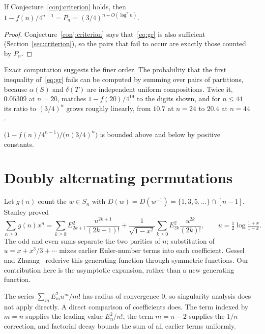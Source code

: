 \documentclass[12pt]{article}
\numberwithin{theorem}{section}
\numberwithin{equation}{section}
\begin{document}
\begin{corollary}\label{cor:rate}
If Conjecture~\ref{conj:criterion} holds, then $1-f(n)/4^{n-1}=P_n=(3/4)^{n+O(\log^2n)}$.
\end{corollary}

\begin{proof}
Conjecture~\ref{conj:criterion} says that~\eqref{eq:gr} is also sufficient (Section~\ref{sec:criterion}), so the
pairs that fail to occur are exactly those counted by $P_n$.
\end{proof}

Exact computation suggests the finer order. The probability that the first inequality of~\eqref{eq:gr} fails
can be computed by summing over pairs of partitions, because $\alpha(S)$ and $\delta(T)$ are independent uniform
compositions. Twice it, $0.05309$ at $n=20$, matches $1-f(20)/4^{19}$ to the digits shown, and for $n\le44$ its
ratio to $(3/4)^n$ grows roughly linearly, from $10.7$ at $n=24$ to $20.4$ at $n=44$.

\begin{conjecture}\label{conj:rate}
$\bigl(1-f(n)/4^{n-1}\bigr)/\bigl(n(3/4)^n\bigr)$ is bounded above and below by positive constants.
\end{conjecture}

\section{Doubly alternating permutations}\label{sec:alt}

Let $g(n)$ count the $w\in S_n$ with $D(w)=D(w^{-1})=\{1,3,5,\dots\}\cap[n-1]$. Stanley
\cite[Theorem~3.1]{stanleyAlt} proved
\begin{equation}\label{eq:stanley}
\sum_{n\ge0}g(n)x^n=\sum_{k\ge0}E_{2k+1}^2\frac{u^{2k+1}}{(2k+1)!}
+\frac{1}{\sqrt{1-x^2}}\sum_{k\ge0}E_{2k}^2\frac{u^{2k}}{(2k)!},\qquad u=\tfrac12\log\tfrac{1+x}{1-x}.
\end{equation}
The odd and even sums separate the two parities of $n$; substitution of $u=x+x^3/3+\cdots$ mixes earlier Euler-number terms into each coefficient. Gessel and Zhuang~\cite[Section~2.4]{gesselZhuang} rederive this generating function through symmetric functions. Our contribution here is the asymptotic expansion, rather than a new generating function.

The series $\sum_m E_m^2u^m/m!$ has radius of convergence $0$, so singularity analysis does not apply
directly. A direct comparison of coefficients does. The term indexed by $m=n$ supplies the leading value $E_n^2/n!$, the term $m=n-2$ supplies the $1/n$ correction, and factorial decay bounds the sum of all earlier terms uniformly.
\end{document}
